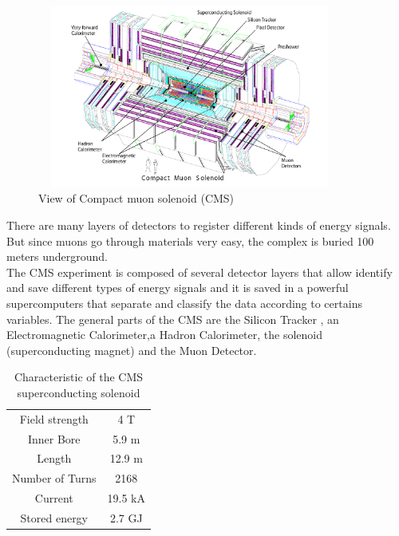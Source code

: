 \begin{figure}[!htbp]
	\centering
	\includegraphics[width=10cm,height=6cm]{Chapter2/cms2.png}
	\caption{View of Compact muon solenoid (CMS)\cite{cms-manual}}\label{cms}
\end{figure}
There are many layers of detectors to register different kinds of energy signals. But since muons go through materials very easy, the complex is buried 100 meters underground.\\ 

The CMS experiment is composed of several detector layers  that allow identify and save different types of energy signals  and it is saved in a powerful supercomputers that separate and classify the data according to certains variables. The general parts of the CMS are the Silicon Tracker , an Electromagnetic Calorimeter,a Hadron Calorimeter, the solenoid (superconducting magnet) and the Muon Detector. \\

\begin{table}[ht]
	\caption{Characteristic of the CMS superconducting solenoid\cite{cms-manual}}
	\centering
	\begin{tabular}{|c|c|}
		\hline
		Field strength & 4 T \\
		Inner Bore & 5.9 m \\
		Length & 12.9 m\\
		Number of Turns & 2168\\
		Current & 19.5 kA\\
		Stored energy & 2.7 GJ\\
		\hline
	\end{tabular}
	\label{tab:my_label}
\end{table}




